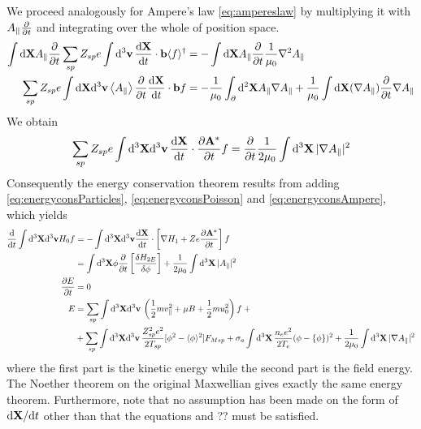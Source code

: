 We proceed analogously for Ampere's law \eqref{eq:ampereslaw} by multiplying it with $ A_\parallel\frac{\partial }{\partial t}$ and integrating over the whole of position space. 
\begin{align}
 \int\mathrm{d}\mathbf{X}A_\parallel\frac{\partial }{\partial t}
 \sum_{sp} Z_{sp} e \int {\rm d}^3 {\bf v} \, \frac{\mathrm{d} \bf X}{\mathrm{d} t} \cdot {\bf b} \langle f \rangle^\dagger  
&=
 -\int\mathrm{d}\mathbf{X}A_\parallel\frac{\partial }{\partial t}\frac{1}{\mu_0} \nabla^2 A_\parallel
\\
\sum_{sp} Z_{sp} e\int\mathrm{d}\mathbf{X}\mathrm{d}^3\mathbf{v}\left\langle A_\parallel\right\rangle\frac{\partial }{\partial t}
   \frac{\mathrm{d} \bf X}{\mathrm{d} t} \cdot {\bf b}  f 
&=
 -\frac{1}{\mu_0}\int_\partial\mathrm{d}^2\mathbf{X} A_\parallel\nabla A_\parallel + \frac{1}{\mu_0} \int\mathrm{d}\mathbf{X}(\nabla A_\parallel)\frac{\partial }{\partial t}\nabla A_\parallel
\end{align}
We obtain 
\begin{equation} 
\sum_{sp} Z_{sp} e \int {\rm d}^3 {\bf X} {\rm d}^3 {\bf v} \,\frac{\mathrm{d} \bf X}{\mathrm{d} t} \cdot \frac{\partial {\bf A}^*}{\partial t}f 
=
 \frac{\partial }{\partial t}\frac{1 }{ 2 \mu_0} \int {\rm d}^3 {\bf X} \, \vert \nabla A_\parallel \vert^2   
\label{eq:energyconsAmpere}
\end{equation}
Consequently the energy conservation theorem results from adding
\eqref{eq:energyconsParticles}, \eqref{eq:energyconsPoisson} and \eqref{eq:energyconsAmpere}, which yields
\begin{align}
  \frac{\mathrm{d} }{\mathrm{d} t}\int\mathrm{d}^3\mathbf{X}\mathrm{d}^3\mathbf{v}H_0f 
&= - \int\mathrm{d}^3\mathbf{X}\mathrm{d}^3\mathbf{v} \frac{\mathrm{d} \bf X}{\mathrm{d} t} \cdot \left [  \nabla H_1 + Z e \frac{\partial {\bf A}^*}{\partial t } \right ] f 
\\
&= \int{\rm d}^3 {\bf X} \phi \frac{\partial }{\partial  t} \left [ \frac{\delta H_{2E}}{\delta \phi} \right ] +  \frac{1 }{ 2 \mu_0} \int {\rm d}^3 {\bf X} \, \vert A_\parallel \vert^2   
\\
\frac{\partial E}{\partial t} &= 0\\
E &=  \sum_{sp} \int {\rm d}^3 {\bf X} {\rm d}^3 {\bf v} \, \left ( \frac{1 }{ 2} m v_\parallel^2 + \mu B  + \frac{1 }{ 2} m u_0^2 \right ) f + \nonumber{}\\
&+
\sum_{sp} \int {\rm d}^3 {\bf X} {\rm d}^3 {\bf v} \, \frac{Z_{sp}^2 e^2}{2 T_{sp} } [ \phi^2 - \langle \phi \rangle^2 ] 
F_{Msp} + \sigma_a \int {\rm d}^3 {\bf X} \, \frac{n_e e^2 }{ 2 T_e} (\phi - \{ \phi \} )^2 + \frac{1 }{ 2 \mu_0} \int {\rm d}^3 {\bf X} \, \vert \nabla A_\parallel \vert^2 
\label{eq:energyconservation}
\end{align}
where the first part is the kinetic energy while the second part is the field energy. The Noether theorem on the original Maxwellian 
gives exactly the same energy theorem. Furthermore, note that no assumption has been made on the form of ${\rm d} {\bf X} / {\rm d} t$ other 
than that the equations and ?? must be satisfied. 

